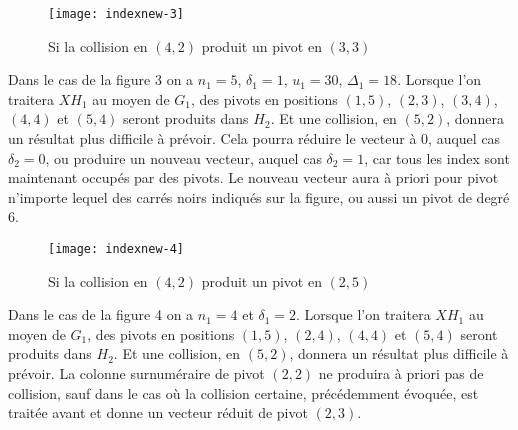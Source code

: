 \begin{figure}[ht]   
%
\begin{center}
\texttt{[image: indexnew-3]}

\caption[figure 3]
{\label{ffig3} Si la collision en $(4,2)$ produit un pivot en $(3,3)$}

\end{center}
\end{figure}


Dans le cas de la figure 3  on a  $n_1=5$, $\delta_1=1$, $u_1=30$, $\Delta_1=18$.
Lorsque l'on traitera $XH_1$ au moyen de $G_1$,
des pivots en positions $(1,5)$, $(2,3)$, $(3,4)$, $(4,4)$ et $(5,4)$
seront produits dans $H_2$. Et une collision, en $(5,2)$, donnera un résultat plus difficile à prévoir.
Cela pourra réduire le vecteur à $0$, auquel cas $\delta_2=0$, ou produire un nouveau
vecteur, auquel cas $\delta_2=1$, car tous les index sont maintenant occupés par des pivots.  Le nouveau vecteur aura à priori pour pivot n'importe lequel des carrés noirs indiqués sur la figure, ou aussi
un pivot de degré $6$.

\begin{figure}[ht]   
%
\begin{center}
\texttt{[image: indexnew-4]}

\caption[figure 4]
{\label{ffig4} Si la collision en $(4,2)$ produit un pivot en $(2,5)$}

\end{center}
\end{figure}


Dans le cas de la figure 4 on a  $n_1=4$ et $\delta_1=2$.
Lorsque l'on traitera $XH_1$ au moyen de $G_1$,
des pivots en positions $(1,5)$, $(2,4)$, $(4,4)$ et $(5,4)$
seront produits dans $H_2$. Et une collision, en $(5,2)$, donnera un résultat plus difficile à prévoir.
La colonne surnuméraire de pivot $(2,2)$ ne produira à priori pas de collision,
sauf dans le cas où la collision certaine, précédemment évoquée, est traitée avant 
et  donne un vecteur réduit de pivot $(2,3)$.

%


